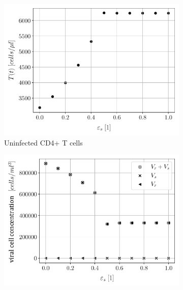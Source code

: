 \begin{figure}
    \centering
    \begin{subfigure}[b]{0.475\textwidth}
        \centering
        \includegraphics[width=\textwidth]{images/evolution_over_epsilon/treated_T.pdf}
        \caption[]%
        {{\small Uninfected CD4+ T cells}}    
        \label{fig3a:uninfected_T_cells}
    \end{subfigure}
    \begin{subfigure}[b]{0.475\textwidth}   
        \centering 
        \includegraphics[width=\textwidth]{images/evolution_over_epsilon/treated_overview_V.pdf}

\end{subfigure}
\end{figure}
